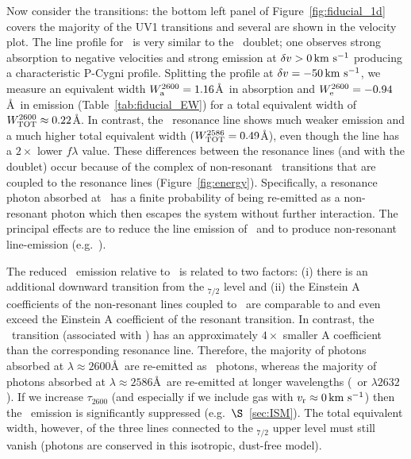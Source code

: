 \documentclass[12pt,preprint]{aastex}
\begin{document}
Now consider the  transitions:
the bottom left panel of Figure~\ref{fig:fiducial_1d} covers the
majority of the  UV1 transitions and several are
shown in the velocity plot.  The line
profile for \feiib\ is very similar to the \mgiid\ doublet;
one observes strong absorption to negative velocities and strong
emission at $\delta v > 0 \, {\rm km~s^{-1}}$ producing a characteristic P-Cygni profile. 
Splitting
the profile at $\delta v = -50 \, {\rm km~s^{-1}}$, we measure an equivalent width
$W^{2600}_{\rm a} = 1.16$\AA\ in absorption and $W^{2600}_{\rm e} =
-0.94$\AA\ in emission (Table~\ref{tab:fiducial_EW}) for a total
equivalent width of $W^{2600}_{\rm TOT} \approx 0.22$\AA.  
In contrast, the \feiia\ resonance line shows much weaker emission and
a much higher total equivalent width ($W^{2586}_{\rm TOT} = 0.49$\AA),
even though the line has a $2 \times$ lower $f\lambda$ value.
These differences between the  resonance lines (and with the
 doublet) occur because of the complex of non-resonant
\feiis\ transitions that are coupled to the resonance lines
(Figure~\ref{fig:energy}).  Specifically, 
a resonance photon absorbed at \feiid\ has a finite probability of
being re-emitted as a non-resonant photon which then escapes the system
without further interaction.  The principal effects are to reduce the
line emission of \feiid\ and to produce non-resonant line-emission (e.g.\
\feiic).

The reduced \feiia\ emission relative to \feiib\ is related to
two factors:
(i) there is an additional downward transition from the
\zconfig$_{7/2}$ level and 
(ii) the Einstein A
coefficients of the non-resonant lines coupled to \feiia\ are comparable to and even
exceed the Einstein A coefficient of
the resonant transition.  In contrast, 
the \feiie\ transition (associated with \feiib)
has an approximately  $4\times$ smaller A coefficient than the
corresponding
resonance line.  Therefore, the majority of photons absorbed at
$\lambda \approx 2600$\AA\ are re-emitted as \feiib\ photons, whereas 
the majority of photons absorbed at $\lambda \approx 2586$\AA\ are re-emitted 
at longer wavelengths (\feiic\ or $\lambda 2632$).
If we %
increase $\tau_{2600}$ (and especially if we include
gas with $v_{\rm r} \approx 0 \, {\rm km~s^{-1}}$) then the \feiib\ emission is
significantly suppressed (e.g.\ $\S$~\ref{sec:ISM}).
The total equivalent width, however, of the three lines connected to the
\zconfig$_{7/2}$ upper level must still vanish (photons are conserved
in this isotropic, dust-free model).
\end{document}
